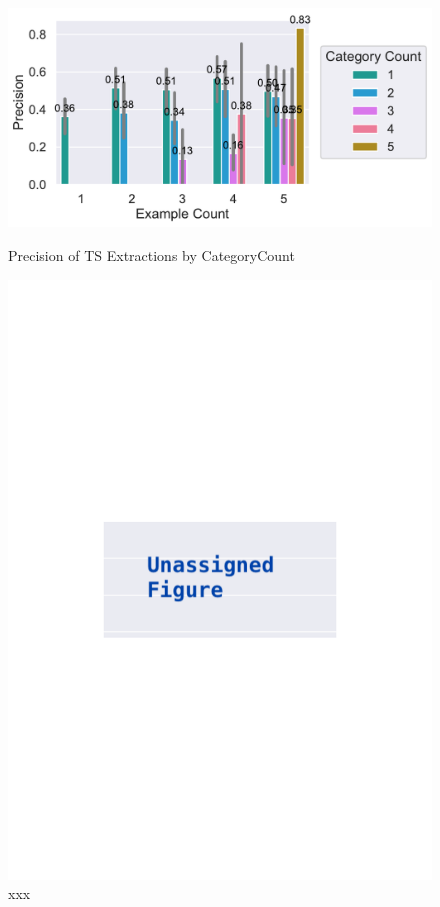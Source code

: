 \documentclass[\myrootdir/main.tex]{subfiles}
\begin{document}
\begin{figure}[htbp]
	\centering
	\begin{minipage}{0.45\textwidth}
		\centering
		\includegraphics[width=\textwidth, clip]{img/big-study/precision-categorycount-examplecount-TS.pdf}
		\caption{Precision of TS Extractions by CategoryCount}
		\label{fig:precision-categorycount-examplecount-ts}
	\end{minipage}\hfill
	\begin{minipage}{0.45\textwidth}
		\centering
		\includegraphics[width=\textwidth, clip]{img/big-study/xxx.pdf}
		\caption{xxx}
		\label{fig:xxx}
	\end{minipage}
\end{figure}
\end{document}
